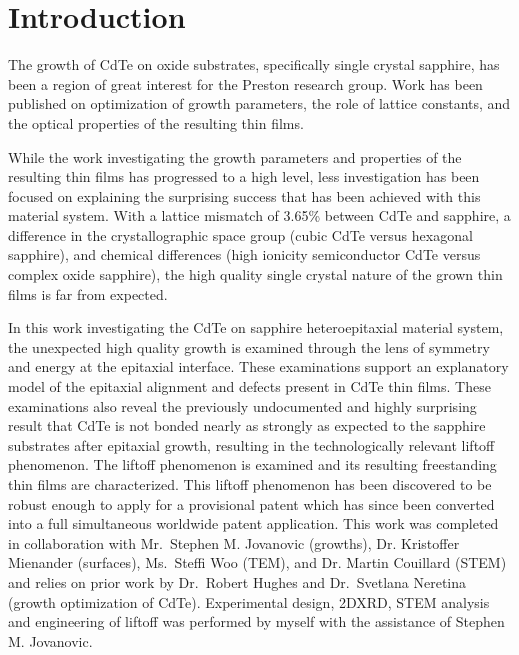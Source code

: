 \section{Introduction}
The growth of CdTe on oxide substrates, specifically single crystal sapphire, has been a region of great interest for the Preston research group.
Work has been published on optimization of growth parameters, the role of lattice constants, and the optical properties of the resulting thin films\cite{Neretina2009a,Neretina2008b,Neretina2009b,Neretina2007,Neretina2006,cdte-optical}.

While the work investigating the growth parameters and properties of the resulting thin films has progressed to a high level, less investigation has been focused on explaining the surprising success that has been achieved with this material system.
With a lattice mismatch of 3.65\% between CdTe and sapphire, a difference in the 
crystallographic space group (cubic CdTe versus hexagonal sapphire), and chemical differences (high ionicity semiconductor CdTe versus complex oxide sapphire), the high quality single crystal nature of the grown thin films is far from expected.

In this work investigating the CdTe on sapphire heteroepitaxial material system, the unexpected high quality growth is examined through the lens of symmetry and energy at the epitaxial interface.
These examinations support an explanatory model of the epitaxial alignment and defects present in CdTe thin films.
These examinations also reveal the previously undocumented and highly surprising result that CdTe is not bonded nearly as strongly as expected to the sapphire substrates after epitaxial growth, resulting in the technologically relevant liftoff phenomenon.
The liftoff phenomenon is examined and its resulting freestanding thin films are characterized.
This liftoff phenomenon has been discovered to be robust enough to apply for a provisional patent\cite{patent} which has since been converted into a full simultaneous worldwide patent application.
This work was completed in collaboration with Mr.~Stephen M. Jovanovic (growths), Dr.
Kristoffer Mienander (surfaces), Ms.~Steffi Woo (TEM), and Dr. Martin Couillard (STEM) and relies on prior work by Dr.~Robert Hughes and Dr.~Svetlana Neretina (growth optimization of CdTe).
Experimental design, 2DXRD, STEM analysis and engineering of liftoff was performed by myself with the assistance of Stephen M. Jovanovic.
